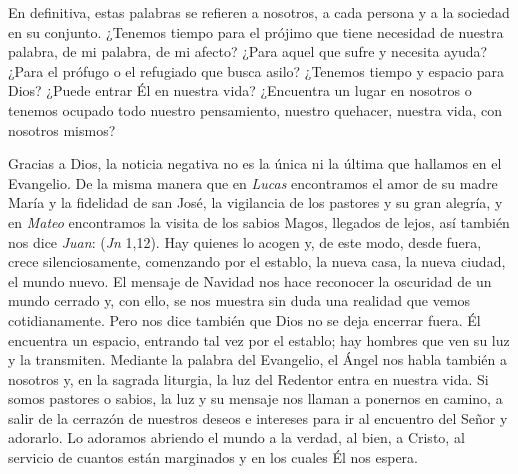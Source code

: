 En definitiva, estas palabras se refieren a nosotros, a cada persona y a la sociedad en su conjunto. ¿Tenemos tiempo para el prójimo que tiene necesidad de nuestra palabra, de mi palabra, de mi afecto? ¿Para aquel que sufre y necesita ayuda? ¿Para el prófugo o el refugiado que busca asilo? ¿Tenemos tiempo y espacio para Dios? ¿Puede entrar Él en nuestra vida? ¿Encuentra un lugar en nosotros o tenemos ocupado todo nuestro pensamiento, nuestro quehacer, nuestra vida, con nosotros mismos?

Gracias a Dios, la noticia negativa no es la única ni la última que hallamos en el Evangelio. De la misma manera que en \emph{Lucas} encontramos el amor de su madre María y la fidelidad de san José, la vigilancia de los pastores y su gran alegría, y en \emph{Mateo} encontramos la visita de los sabios Magos, llegados de lejos, así también nos dice \emph{Juan}:  (\emph{Jn} 1,12). Hay quienes lo acogen y, de este modo, desde fuera, crece silenciosamente, comenzando por el establo, la nueva casa, la nueva ciudad, el mundo nuevo. El mensaje de Navidad nos hace reconocer la oscuridad de un mundo cerrado y, con ello, se nos muestra sin duda una realidad que vemos cotidianamente. Pero nos dice también que Dios no se deja encerrar fuera. Él encuentra un espacio, entrando tal vez por el establo; hay hombres que ven su luz y la transmiten. Mediante la palabra del Evangelio, el Ángel nos habla también a nosotros y, en la sagrada liturgia, la luz del Redentor entra en nuestra vida. Si somos pastores o sabios, la luz y su mensaje nos llaman a ponernos en camino, a salir de la cerrazón de nuestros deseos e intereses para ir al encuentro del Señor y adorarlo. Lo adoramos abriendo el mundo a la verdad, al bien, a Cristo, al servicio de cuantos están marginados y en los cuales Él nos espera.

